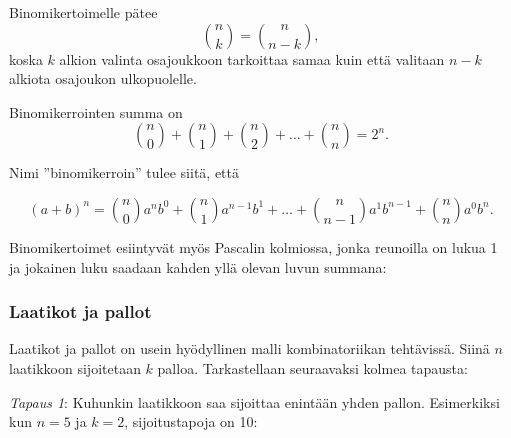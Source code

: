 Binomikertoimelle pätee
\[
{n \choose k}  =  {n \choose n-k},
\]
koska $k$ alkion valinta osajoukkoon
tarkoittaa samaa kuin että valitaan
$n-k$ alkiota osajoukon ulkopuolelle.

Binomikerrointen summa on
\[
{n \choose 0}+{n \choose 1}+{n \choose 2}+\ldots+{n \choose n}=2^n.
\]

Nimi ''binomikerroin'' tulee siitä, että

\[ (a+b)^n =
{n \choose 0} a^n b^0 + 
{n \choose 1} a^{n-1} b^1 +
\ldots + 
{n \choose n-1} a^1 b^{n-1} +
{n \choose n} a^0 b^n. \]

Binomikertoimet esiintyvät myös Pascalin
kolmiossa, jonka reunoilla on lukua 1
ja jokainen luku saadaan
kahden yllä olevan luvun summana:
\begin{center}
\end{center}

\subsubsection{Laatikot ja pallot}

Laatikot ja pallot on usein hyödyllinen malli
kombinatoriikan tehtävissä.
Siinä $n$ laatikkoon sijoitetaan $k$ palloa.
Tarkastellaan seuraavaksi kolmea tapausta:

\textit{Tapaus 1}: Kuhunkin laatikkoon saa sijoittaa
enintään yhden pallon.
Esimerkiksi kun $n=5$ ja $k=2$,
sijoitustapoja on 10:

\begin{center}
\end{center}

